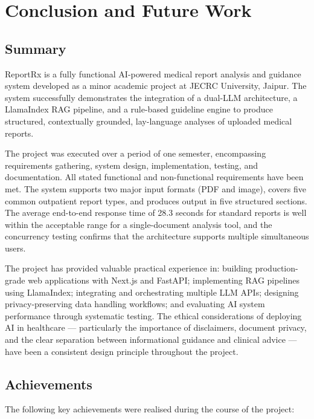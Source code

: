 \chapter{Conclusion and Future Work}

\section{Summary}
ReportRx is a fully functional AI-powered medical report analysis and guidance system developed as a minor academic project at JECRC University, Jaipur. The system successfully demonstrates the integration of a dual-LLM architecture, a LlamaIndex RAG pipeline, and a rule-based guideline engine to produce structured, contextually grounded, lay-language analyses of uploaded medical reports.

The project was executed over a period of one semester, encompassing requirements gathering, system design, implementation, testing, and documentation. All stated functional and non-functional requirements have been met. The system supports two major input formats (PDF and image), covers five common outpatient report types, and produces output in five structured sections. The average end-to-end response time of 28.3 seconds for standard reports is well within the acceptable range for a single-document analysis tool, and the concurrency testing confirms that the architecture supports multiple simultaneous users.

The project has provided valuable practical experience in: building production-grade web applications with Next.js and FastAPI; implementing RAG pipelines using LlamaIndex; integrating and orchestrating multiple LLM APIs; designing privacy-preserving data handling workflows; and evaluating AI system performance through systematic testing. The ethical considerations of deploying AI in healthcare --- particularly the importance of disclaimers, document privacy, and the clear separation between informational guidance and clinical advice --- have been a consistent design principle throughout the project.

\section{Achievements}
The following key achievements were realised during the course of the project:

